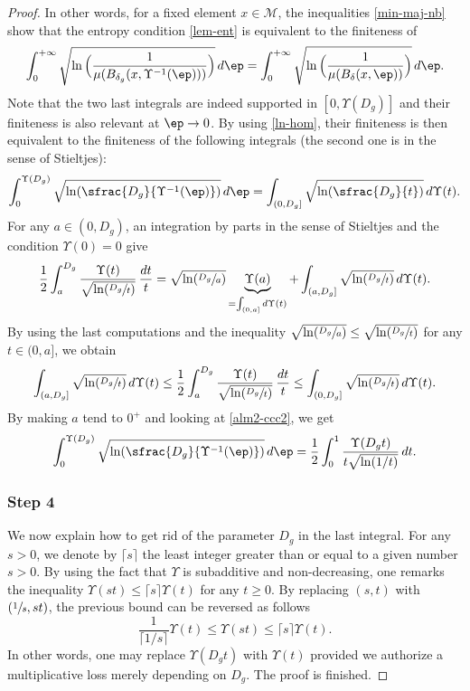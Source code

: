 \begin{proof}
In other words, for a fixed element $x\in \mathcal{M}$, the inequalities \eqref{min-maj-nb} show that the entropy condition \eqref{lem-ent} is equivalent to the finiteness of
\begin{equation*}
\int_{0}^{+\infty} \sqrt{\ln\Big(\frac{1}{\mu(B_{\delta_g}(x,\Upsilon^{-1}(\ep)))} \Big)} \,d\ep=\int_{0}^{+\infty} \sqrt{\ln\Big(\frac{1}{\mu(B_\delta(x,\ep))} \Big)} \,d\ep.
\end{equation*}
Note that the two last integrals are indeed supported in $[0,\Upsilon(D_g)]$ and their finiteness is also relevant at $\ep\to 0$. By using \eqref{ln-hom}, their finiteness is then equivalent to the finiteness of the following integrals (the second one is in the sense of Stieltjes):
\begin{equation}\label{alm2-ccc2}
\int_{0}^{\Upsilon(D_g)} \sqrt{\ln(\sfrac{D_g}{\Upsilon^{-1}(\ep)})} \,d\ep =\int_{(0,D_g]}
\sqrt{\ln(\sfrac{D_{g}}{t})}\,d\Upsilon(t).
\end{equation}
For any $a\in (0,D_g)$, an integration by parts in the sense of Stieltjes and the condition $\Upsilon(0)=0$ give\vspace*{-3pt}
\[
\frac{1}{2}\int_{a}^{D_g}\frac{\Upsilon(t)}{\sqrt{\ln(\sfrac{D_g}{t})}}\,\frac{dt}{t}=\sqrt{\ln(\sfrac{D_{g}}{a})}\underbrace{\Upsilon(a)}_{=\int_{(0,a]} d\Upsilon(t)}+\int_{(a,D_g]}
\sqrt{\ln(\sfrac{D_{g}}{t})}\,d\Upsilon(t).
\]
By using the last computations and the inequality $\sqrt{\ln(\sfrac{D_g}{a})}\leq \sqrt{\ln(\sfrac{D_g}{t})}$ for any $t\in (0,a]$, we obtain\vspace*{-3pt}
\[
\int_{(a,D_g]}\sqrt{\ln(\sfrac{D_{g}}{t})}\,d\Upsilon(t)\leq \frac{1}{2}\int_{a}^{D_g}\frac{\Upsilon(t)}{\sqrt{\ln(\sfrac{D_g}{t})}}\,\frac{dt}{t} \leq \int_{(0,D_g]}\sqrt{\ln(\sfrac{D_{g}}{t})}\,d\Upsilon(t).
\]
By making $a$ tend to $0^+$ and looking at \eqref{alm2-ccc2}, we get
\begin{equation*}
\int_{0}^{\Upsilon(D_{g})} \sqrt{\ln(\sfrac{D_{g}}{\Upsilon^{-1}(\ep)})}\,d\ep=\frac{1}{2}\int_{0}^1 \frac{\Upsilon(D_g t)}{t\sqrt{\ln(1/t)}}\,dt.
\end{equation*}

\subsubsection*{Step 4} We now explain how to get rid of the parameter $D_g$ in the last integral.
For any $s>0$, we denote by $\lceil s\rceil$ the least integer greater than or equal to a given number $s>0$.
By using the fact that $\Upsilon$ is subadditive and non-decreasing, one remarks the inequality $\Upsilon(st)\leq \lceil s \rceil \Upsilon(t)$ for any $t\geq 0$. By replacing $(s,t)$ with $(\sfrac{1}{s},st)$, the previous bound can be reversed as follows\vspace*{-1pt}
\begin{equation}\label{subb}
\frac{1}{\lceil 1/s\rceil} \Upsilon(t)\leq \Upsilon(st)\leq \lceil s \rceil \Upsilon(t).
\end{equation}
In other words, one may replace $\Upsilon(D_{g} t)$ with $\Upsilon(t)$ provided we authorize a multiplicative loss merely depending on $D_{g}$. The proof is finished.
\end{proof}

